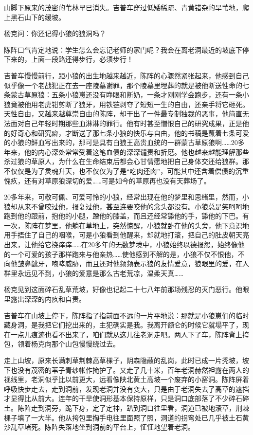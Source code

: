 \par 
\par 山脚下原来的茂密的苇林早已消失。吉普车穿过低矮稀疏、青黄错杂的旱苇地，爬上黑石山下的缓坡。
\par 杨克问：你还记得小狼的狼洞吗？
\par 陈阵口气肯定地说：学生怎么会忘记老师的家门呢？我会在离老洞最近的坡底下停下来的，上面一段路还得步行，必须步行！
\par 吉普车慢慢前行，距小狼的出生地越来越近，陈阵的心骤然紧张起来，他感到自己似乎像一个老战犯正在去一座陵墓谢罪，那个陵墓里埋葬的就是被他断送性命的七条蒙古草原狼：五条小狼崽还没有睁眼和断奶，一条才刚刚学会跑步，还有一条小狼竟被他用老虎钳剪断了狼牙，用铁链剥夺了短短一生的自由，还亲手将它砸死。天性自由，又越来越尊崇自由的陈阵，却干出了一件最专制独裁的恶事，他简直无法面对自己年轻时期那些血淋淋的罪行。他有时甚至憎恨自己的研究成果，正是他的好奇心和研究癖，才断送了那七条小狼的快乐与自由，他的书稿是蘸着七条可爱的小狼的鲜血写出来的，那可是具有白狼王高贵血统的一群蒙古草原狼啊……20多年来，他的内心深处常常受着这笔血债的深深谴责和折磨。他也越来越能理解那些杀过狼的草原人，为什么在生命结束后都会心甘情愿地把自己身体交还给狼群。那不仅仅是为了灵魂升天，也不仅仅为了是“吃肉还肉”，可能其中还含着偿债的沉重愧疚，还有对草原狼深切的爱……可是如今的草原再也没有天葬场了。
\par 20多年来，可敬可佩、可爱可怜的小狼，经常出现在他的梦里和思绪里，然而，小狼却从来不曾咬过他，报复过他，甚至连要咬他的念头都没有。小狼总是笑呵呵地跑到他的跟前，抱他的小腿，蹭他的膝盖，而且还经常舔他的手，舔他的下巴。有一次，陈阵在梦里，他躺在草地上，突然惊醒，小狼就卧在他的头旁，他下意识地用手捂住了自己的咽喉，可是小狼看到他醒来，却就地打滚，把自己的肚皮朝天亮出来，让他给它挠痒痒……在20多年的无数梦境中，小狼始终以德报怨，始终像他的一个可爱的孩子那样跑来与他亲热……使他感到不解的是，小狼不仅不恨他，不向他皱鼻龇牙，咆哮威胁，而且还对他频频表示狼的友情爱意，狼眼里的爱，在人群里永远见不到，小狼的爱意是那么古老荒凉，温柔天真……
\par 杨克见到这面碎石乱草荒坡，好像也记起二十七八年前那场残忍的灭门恶行。他眼里露出深深的内疚和自责。
\par 吉普车在山坡上停下，陈阵指了指前面不远的一片平地说：那就是小狼崽们的临时藏身洞，是我把它们挖出来的，主犯确实是我。我离开额仑的时候它就塌平了，现在一点儿痕迹也看不出来了，咱们就从这儿往老洞走吧。两人下了车，陈阵背上挎包，领着杨克向那个山包慢慢绕过去。
\par 走上山坡，原来长满刺草荆棘高草棵子，阴森隐蔽的乱岗，此时已成一片秃坡，坡下也没有茂密的苇子青纱帐作掩护了。又走了几十米，百年老洞赫然袒露在两人的视线里，老洞似乎比以前更大，远看像陕北黄土高坡一个废弃的小窑洞。陈阵屏着呼吸快步走去，走到洞前，发现老洞并没有变大，只是由于老洞失去了高草的遮挡才显得比从前大。连年的干旱使洞形基本保持原样，只是洞口底部落了不少碎石碎土。陈阵走到洞旁，跪下身，定了定神，趴到洞口往里看，洞道已被地滚草，荆棘棵子填了一大半。他从挎包里掏手电往里面照了照，洞道的拐弯处已几乎被土石黄沙乱草堵死。陈阵失落地坐到洞前的平台上，怔怔地望着老洞。
